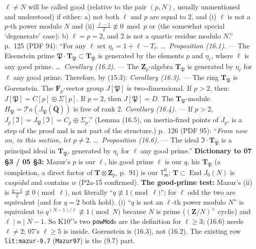 \begin{hypothesis}
  $\ell\ne N$ will be called good (relative to the pair $(p,N)$, usually unmentioned and understood) if either: a) not both $\ell$ and $p$ are
  equal to $2$, and (i) $\ell$ is not a $p$-th power modulo $N$ and (ii) $\frac{\ell-1}{2}\not\equiv0\bmod p$ or (the somewhat special
  `degenerate' case): b) $\ell=p=2$, and $2$ is not a quartic residue modulo $N$.''
  p.~125 (PDF 94): ``For any $\ell$ set $\eta_\ell=1+\ell-T_\ell$. \dots\ \emph{Proposition (16.1).} --- The Eisenstein prime
  $\mathfrak P\cdot\mathbf T_{\mathfrak P}\subset\mathbf T_{\mathfrak P}$ is generated by the elements $p$ and $\eta_\ell$, where $\ell$ is any good prime.
  \dots\ \emph{Corollary (16.2).} --- The $\mathbf Z_p$-algebra $\mathbf T_{\mathfrak P}$ is generated by $\eta_\ell$ for $\ell$ any good prime.
  Therefore, by (15.3): \emph{Corollary (16.3).} --- The ring $\mathbf T_{\mathfrak P}$ is Gorenstein. The $\mathbf F_p$-vector group $J[\mathfrak P]$ is
  two-dimensional. If $p>2$, then: $J[\mathfrak P]=C[p]\oplus\Sigma[p]$. If $p=2$, then $J[\mathfrak P]=D$. The $\mathbf T_{\mathfrak P}$-module
  $H_{\mathfrak P}=\mathcal Ta(J_{\mathfrak P}(\bar{\mathbf Q}))$ is free of rank 2. \emph{Corollary (16.4).} --- If $p>2$,
  $J_p[\mathfrak I]=J_{\mathfrak P}[\mathfrak I]=C_p\oplus\Sigma_p$.'' (Lemma (16.5), on inertia-fixed points of $J_p$, is a step of the proof and
  is not part of the structure.) p.~126 (PDF 95): ``\emph{From now on, in this section, let $p\ne2$.} \dots\ \emph{Proposition (16.6).} --- The
  ideal $\mathfrak I\cdot\mathbf T_{\mathfrak P}$ is a principal ideal in $\mathbf T_{\mathfrak P}$, generated by $\eta_\ell$ for $\ell$ any good prime.''
  \textbf{Dictionary to 07 \S3 / 05 \S3:} Mazur's $p$ is our $\ell$, his good prime $\ell$ is our $q$, his $\mathbf T_{\mathfrak P}$ (a completion,
  a direct factor of $\mathbf T\otimes\mathbf Z_p$, p.~91) is our $\mathbb T^0_{\mathfrak m}$; $\mathbf T\subset\operatorname{End}J_0(N)$ is
  \emph{cuspidal} and contains $w$ (P2a-15 confirmed). \textbf{The good-prime test:} Mazur's (ii) is $\frac{q-1}{2}\not\equiv0\pmod\ell$, not
  literally ``$q\not\equiv1\pmod\ell$''; for $\ell$ odd the two are equivalent (and for $q=2$ both hold). (i) ``$q$ is not an $\ell$-th power
  modulo $N$'' is equivalent to $q^{(N-1)/\ell}\not\equiv1\pmod N$ because $N$ is prime ($(\mathbf Z/N)^\times$ cyclic) and $\ell\mid n\mid N-1$.
  So K10$'$'s two \texttt{powMod}s are the definition for $\ell\ge3$; (16.6) needs $\ell\ne2$; 07's $\ell\ge5$ is inside. Gorenstein is (16.3),
  not (16.2). The existing row \texttt{lit:mazur-9.7} (\texttt{Mazur97}) is the (9.7) part.
\end{hypothesis}

